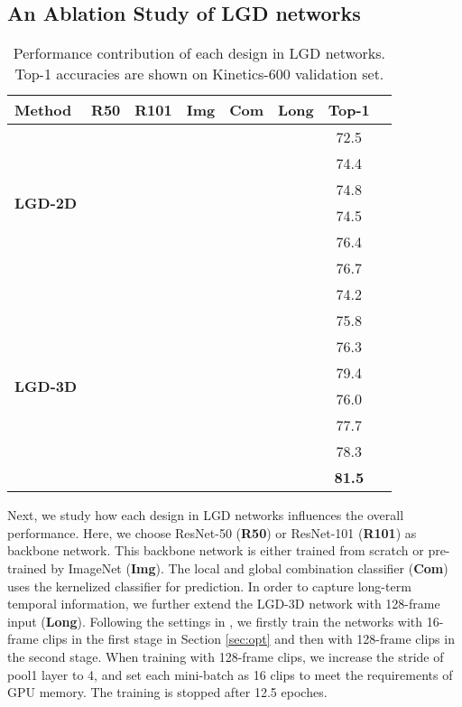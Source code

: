 \documentclass[10pt,twocolumn,letterpaper]{article}
\begin{document}
\subsection{An Ablation Study of LGD networks}
\begin{table}
\centering
\small
\caption{\small Performance contribution of each design in LGD networks. Top-1 accuracies are shown on Kinetics-600 validation set.}
\vspace{0.1cm}
\begin{tabular}{l@{~}|ccccc|cc} \hline
\begin{minipage}{1.5cm}\vspace{0.12cm} \textbf{Method} \vspace{0.12cm}\end{minipage}     & \textbf{R50} & \textbf{R101} & \textbf{Img} & \textbf{Com} & \textbf{Long} & \textbf{Top-1} \\ \hline
\multirow{6}{*}{\textbf{LGD-2D}} &&&&&& 72.5\\
&&&&&& 74.4\\
&&&&&& 74.8\\ \cline{2-7}
&&&&&& 74.5\\
&&&&&& 76.4\\
&&&&&& 76.7\\ \hline
\multirow{8}{*}{\textbf{LGD-3D}} &&&&&& 74.2\\
&&&&&& 75.8\\
&&&&&& 76.3\\
&&&&&& 79.4\\ \cline{2-7}
&&&&&& 76.0\\
&&&&&& 77.7\\
&&&&&& 78.3\\
&&&&&& \textbf{81.5}\\ \hline
\end{tabular}
\vspace{-0.15in}
\label{tab:ablation}
\end{table}

Next, we study how each design in LGD networks influences the overall performance. Here, we choose ResNet-50 (\textbf{R50}) or ResNet-101 (\textbf{R101}) as backbone network. This backbone network is either trained from scratch or pre-trained by ImageNet (\textbf{Img}). The local and global combination classifier (\textbf{Com}) uses the kernelized classifier for prediction. In order to capture long-term temporal information, we further extend the LGD-3D network with 128-frame input (\textbf{Long}). Following the settings in \cite{wang2018non}, we firstly train the networks with 16-frame clips in the first stage in Section \ref{sec:opt} and then with 128-frame clips in the second stage. When training with 128-frame clips, we increase the stride of pool1 layer to 4, and set each mini-batch as 16 clips to meet the requirements of GPU memory. The training is stopped after 12.5 epoches.
\end{document}
